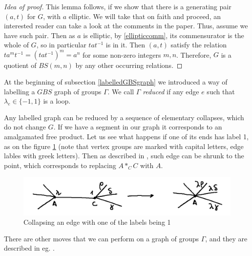\begin{proof}[Idea of proof]
 This lemma follows, if we show that there is a generating pair $(a,t)$ for $G$, with $a$ elliptic. We will take that on faith and proceed, an interested reader can take a look at the comments in the paper. Thus, assume we have such pair. Then as $a$ is elliptic, by \ref{ellipticcomm}, its commensurator is the whole of $G$, so in particular $tat^{-1}$ is in it. Then $(a,t)$ satisfy the relation $ta^mt^{-1} = (tat^{-1})^m = a^n$ for some non-zero integers $m,n$. Therefore, $G$ is a quotient of $BS(m,n)$ by any other occurring relations.
\end{proof}

\begin{definition}
    At the beginning of subsection \ref{labelledGBSgraph} we introduced a way of labelling a $GBS$ graph of groups $\Gamma$. We call $\Gamma$ \emph{reduced} if any edge $e$ such that $\lambda_e \in \{-1,1\}$ is a loop.
\end{definition}

\begin{remark}
    Any labelled graph can be reduced by a sequence of elementary collapses, which do not change $G$. If we have a segment in our graph it corresponds to an amalgamated free product. Let us see what happens if one of its ends has label 1, as on the figure \ref{collapsingedge} (note that vertex groups are marked with capital letters, edge lables with greek letters). Then as described in \cite{For06}, such edge can be shrunk to the point, which corresponds to replacing $A \ast_C C$ with $A$. 
\end{remark}

\begin{figure}[h]
    \centering
    \includegraphics[scale=0.15]{sections/alicja/collapse move.jpeg}
    \caption{Collapsing an edge with one of the labels being 1}
    \label{collapsingedge}
\end{figure}

\begin{remark}
    There are other moves that we can perform on a graph of groups $\Gamma$, and they are described in eg. \cite{For06}.
\end{remark}


